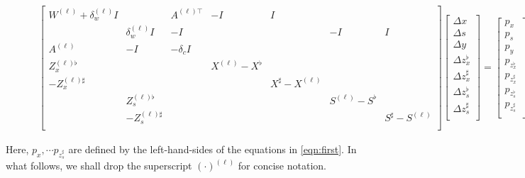 \begin{figure}[h!]
  \begin{align}\label{eqn:very-long-eqn}
    \begin{bmatrix}
      W^{(\ell)}  + \delta^{(\ell)}_w I & & A^{(\ell)\top}& -I & I &  \\
      & \delta^{(\ell)}_w I & -I&&&-I & I\\
      A^{(\ell)}& -I & -\delta_c I\\
      Z_x^{(\ell)\flat}&&&X^{(\ell)}-X^\flat\\
      -Z_x^{(\ell)\sharp}&&&&X^\sharp-X^{(\ell)}\\
      &Z_s^{(\ell)\flat}&&&&S^{(\ell)}-S^\flat\\
      &-Z_s^{(\ell)\sharp}&&&&&S^\sharp-S^{(\ell)}\\
    \end{bmatrix}
    \begin{bmatrix}
      \Delta x \\
      \Delta s \\
      \Delta y \\
      \Delta z_x^\flat \\
      \Delta z_x^\sharp \\
      \Delta z_s^\flat \\
      \Delta z_s^\sharp \\
    \end{bmatrix} =
    \begin{bmatrix}
      p_{x }\\
      p_{s }\\
      p_{y }\\
      p_{z_x^\flat }\\
      p_{z_x^\sharp }\\
      p_{z_s^\flat }\\
      p_{z_s^\sharp }\\
    \end{bmatrix}
  \end{align}
\end{figure}
Here, $p_x,\cdots p_{z_s^\sharp}$ are defined by the left-hand-sides of the equations in
\eqref{eqn:first}. In what follows, we shall drop the superscript
$(\cdot)^{(\ell)}$ for concise notation.

